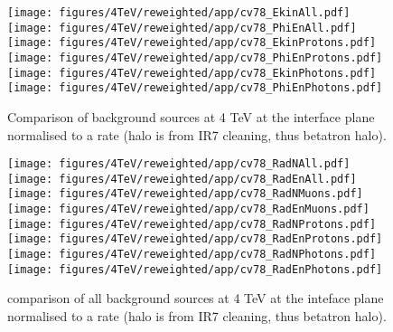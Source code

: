 \begin{figure}
\begin{center}
  \texttt{[image: figures/4TeV/reweighted/app/cv78\_EkinAll.pdf]}
  \texttt{[image: figures/4TeV/reweighted/app/cv78\_PhiEnAll.pdf]}
  \texttt{[image: figures/4TeV/reweighted/app/cv78\_EkinProtons.pdf]}
  \texttt{[image: figures/4TeV/reweighted/app/cv78\_PhiEnProtons.pdf]}
  \texttt{[image: figures/4TeV/reweighted/app/cv78\_EkinPhotons.pdf]}
  \texttt{[image: figures/4TeV/reweighted/app/cv78\_PhiEnPhotons.pdf]}
\end{center}
\vspace{-0.6cm}
 \caption{Comparison of background sources at 4 TeV at the interface plane normalised to a rate (halo is from IR7 cleaning, thus betatron halo).
  \label{compAllBKG4TeV_rates}}
\end{figure}

\begin{figure}
\begin{center}
  \texttt{[image: figures/4TeV/reweighted/app/cv78\_RadNAll.pdf]}
  \texttt{[image: figures/4TeV/reweighted/app/cv78\_RadEnAll.pdf]}
  \texttt{[image: figures/4TeV/reweighted/app/cv78\_RadNMuons.pdf]}
  \texttt{[image: figures/4TeV/reweighted/app/cv78\_RadEnMuons.pdf]}
  \texttt{[image: figures/4TeV/reweighted/app/cv78\_RadNProtons.pdf]}
  \texttt{[image: figures/4TeV/reweighted/app/cv78\_RadEnProtons.pdf]}
  \texttt{[image: figures/4TeV/reweighted/app/cv78\_RadNPhotons.pdf]}
  \texttt{[image: figures/4TeV/reweighted/app/cv78\_RadEnPhotons.pdf]}
\end{center}
\vspace{-0.6cm}
 \caption{comparison of all background sources at 4 TeV at the inteface plane normalised to a rate (halo is from IR7 cleaning, thus betatron halo).
  \label{compAllBKG4TeV_rates2}}
\end{figure}




